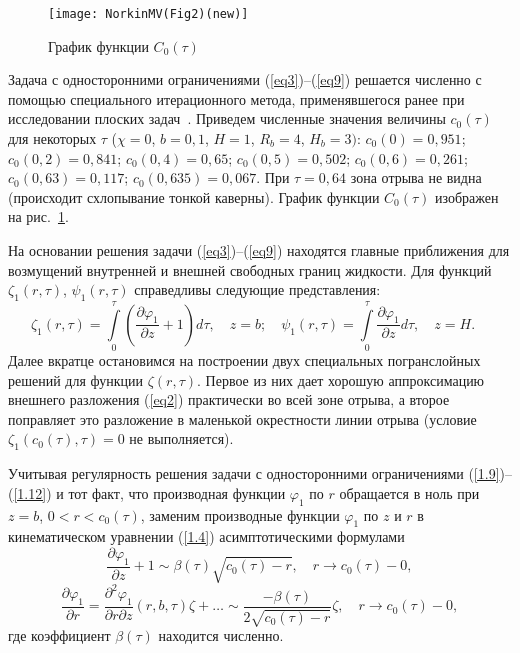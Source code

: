 \documentclass[press]{vestnik}
\begin{document}
\begin{figure}
\centering
\texttt{[image: NorkinMV(Fig2)(new)]}
\caption{График функции $C_0(\tau)$}
\label{fig2}
\end{figure}

Задача с односторонними ограничениями (\ref{eq3})--(\ref{eq9}) решается численно с 
помощью специального итерационного метода, применявшегося ранее при 
исследовании плоских задач~\cite{B02,B03,B04}. Приведем численные значения величины 
$c_{0} (\tau )$ для некоторых $\tau $ ($\chi =0$, $b=0,1$, $H=1$, $R_{b} 
=4$, $H_{b} =3)$: $c_{0} (0)=0,951$; $c_{0} (0,2)=0,841$; $c_{0} 
(0,4)=0,65$; $c_{0} (0,5)=0,502$; $c_{0} (0,6)=0,261$; $c_{0} (0,63)=0,117$; 
$c_{0} (0,635)=0,067$. При $\tau =0,64$ зона отрыва не видна (происходит 
схлопывание тонкой каверны). График функции $C_0(\tau)$ изображен на рис.~\ref{fig2}. 

На основании решения задачи (\ref{eq3})--(\ref{eq9}) находятся главные приближения для 
возмущений внутренней и внешней свободных границ жидкости. Для функций 
$\zeta_{1} (r,\tau )$, $\psi_{1} (r,\tau )$ справедливы следующие 
представления:
\begin{equation}
\label{eq10}
\zeta_{1} (r,\tau )=\int\limits_0^\tau {\left( {\frac{\partial \varphi_{1} }{\partial z}+1} 
\right)} d\tau ,
\quad
z=b;
\quad
\psi_{1} (r,\tau )=\int\limits_0^\tau {\frac{\partial \varphi_{1} }{\partial z}d\tau } ,
\quad
z=H.
\quad
\end{equation}
Далее вкратце остановимся на построении двух специальных погранслойных 
решений для функции $\zeta (r,\tau )$. Первое из них дает хорошую 
аппроксимацию внешнего разложения (\ref{eq2}) практически во всей зоне отрыва, а 
второе поправляет это разложение в маленькой окрестности линии отрыва 
(условие $\zeta_{1} (c_{0} (\tau ),\tau )=0$ не выполняется).

Учитывая регулярность решения задачи с односторонними ограничениями (\ref{1.9})--(\ref{1.12}) и тот факт, что производная функции $\varphi_{1} $ по $r$ обращается в 
ноль при $z=b$, $0<r<c_{0} (\tau )$, заменим производные функции $\varphi_{1} $ 
по $z$ и $r$ в кинематическом уравнении (\ref{1.4}) асимптотическими формулами
\begin{equation}
\label{eq11}
\frac{\partial \varphi_{1} }{\partial z}+1\sim \beta (\tau )\sqrt {c_{0} (\tau 
)-r} ,
\quad
r\to c_{0} (\tau )-0,
\end{equation}
\[
\frac{\partial \varphi_{1} }{\partial r}=\frac{\partial^{2}\varphi_{1} 
}{\partial r\partial z}(r,b,\tau ) \zeta +\ldots \sim \frac{-\beta (\tau 
)}{2\sqrt {c_{0} (\tau )-r} }\zeta ,
\quad
r\to c_{0} (\tau )-0,
\]
где коэффициент $\beta (\tau )$ находится численно.
\end{document}
